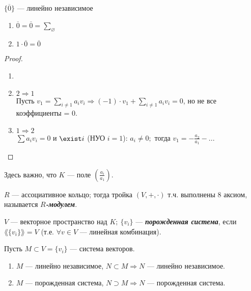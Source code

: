 \begin{example}
    $\{\overline{0}\}$ — линейно независимое 
    \begin{enumerate}
        \item $\overline{0} =\overline{0}=\sum\limits_{\varnothing}$
        \item $1\cdot \overline{0}=\overline{0}$
    \end{enumerate}
\end{example}
\begin{proof}
\begin{enumerate}
    \item[]
    \item[\circ] $2\Rightarrow 1$ \\
    Пусть $v_1=\sum\limits_{i\neq 1}a_iv_i\Rightarrow (-1)\cdot 
v_1+\sum\limits_{i\neq 1}a_iv_i=0$, но не все коэффициенты = 0.
    \item[\circ] $1\Rightarrow 2$ \\
    $\sum a_iv_i=0$ и $\exist i$ (НУО $i=1$): $a_i\neq 0;$ тогда 
$v_1=-\frac{a_2}{a_1}-...$
\end{enumerate}
\end{proof}

\begin{remark}
    Здесь важно, что $K$ — поле $(\frac{a_i}{a_1})$.
\end{remark}

\begin{definition}
    $R$ — ассоциативное кольцо; тогда тройка $(V,+,\cdot)$ т.ч. выполнены 
8 аксиом, называется $R$\textbf{\textit{-модулем}}.
\end{definition}

\begin{definition}
    $V$ — векторное пространство над $K;\ \{v_i\}$ — 
\textbf{\textit{порожденная система}}, если $\lang\{v_i\} \rang =V$ (т.е. 
$\forall v\in V$ — линейная комбинация).
\end{definition}

\begin{remark}
    Пусть $M\subset V=\{v_i\}$ — система векторов.
    \begin{enumerate}
        \item $M$  — линейно независимое, $N\subset M\Rightarrow N$ — 
линейно независимое.
        \item $M$  — порожденная система, $N\supset M\Rightarrow N$ — 
порожденная система.
    \end{enumerate}
\end{remark}

